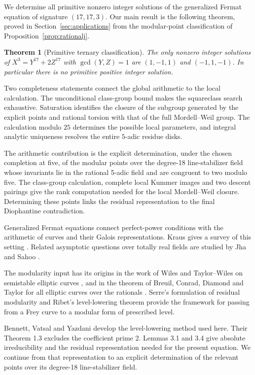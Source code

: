 \documentclass[11pt,a4paper]{article}
\newtheorem{theorem}{Theorem}[section]
\theoremstyle{definition}\newtheorem{definition}[theorem]{Definition}
\theoremstyle{remark}\newtheorem{remark}[theorem]{Remark}
\begin{document}
We determine all primitive nonzero integer solutions of the generalized Fermat equation of signature $(17,17,3)$. Our main result is the following theorem, proved in Section~\ref{sec:applications} from the modular-point classification of Proposition~\ref{prop:rationalj}.

\begin{theorem}[Primitive ternary classification]\label{thm:ternary}
The only nonzero integer solutions of $X^3=Y^{17}+2Z^{17}$ with $\gcd(Y,Z)=1$ are $(1,-1,1)$ and $(-1,1,-1)$. In particular there is no primitive positive integer solution.
\end{theorem}



Two completeness statements connect the global arithmetic to the local calculation. The unconditional class-group bound makes the squareclass search exhaustive. Saturation identifies the closure of the subgroup generated by the explicit points and rational torsion with that of the full Mordell--Weil group. The calculation modulo $25$ determines the possible local parameters, and integral analytic uniqueness resolves the entire $5$-adic residue disks.

The arithmetic contribution is the explicit determination, under the chosen completion at five, of the modular points over the degree-18 line-stabilizer field whose invariants lie in the rational 5-adic field and are congruent to two modulo five. The class-group calculation, complete local Kummer images and two descent pairings give the rank computation needed for the local Mordell--Weil closure. Determining these points links the residual representation to the final Diophantine contradiction.

Generalized Fermat equations connect perfect-power conditions with the arithmetic of curves and their Galois representations. Kraus gives a survey of this setting \cite{Kraus}. Related asymptotic questions over totally real fields are studied by Jha and Sahoo \cite{JhaSahoo}.

The modularity input has its origins in the work of Wiles and Taylor--Wiles on semistable elliptic curves \cite{Wiles,TaylorWiles}, and in the theorem of Breuil, Conrad, Diamond and Taylor for all elliptic curves over the rationals \cite{BCDT}. Serre's formulation of residual modularity \cite{Serre} and Ribet's level-lowering theorem \cite{Ribet} provide the framework for passing from a Frey curve to a modular form of prescribed level.

Bennett, Vatsal and Yazdani \cite{BVY} develop the level-lowering method used here. Their Theorem 1.3 excludes the coefficient prime 2. Lemmas 3.1 and 3.4 give absolute irreducibility and the residual representation needed for the present equation. We continue from that representation to an explicit determination of the relevant points over its degree-18 line-stabilizer field.
\end{document}
